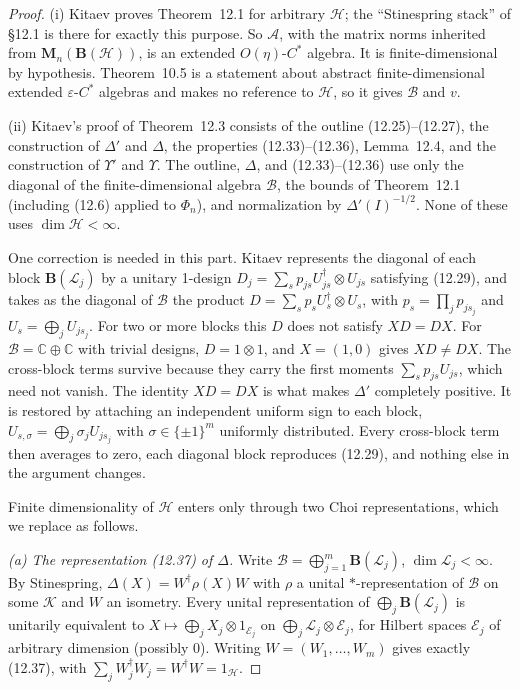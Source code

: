 \documentclass[11pt]{article}
\theoremstyle{remark}
\newcommand{\eps}{\varepsilon}
\newcommand{\cA}{\mathcal{A}}
\newcommand{\cB}{\mathcal{B}}
\newcommand{\cH}{\mathcal{H}}
\newcommand{\cK}{\mathcal{K}}
\newcommand{\cL}{\mathcal{L}}
\newcommand{\cE}{\mathcal{E}}
\newcommand{\Bo}{\mathbf{B}}
\newcommand{\Ma}[1]{\mathbf{M}_{#1}}
\begin{document}
\begin{proof}
(i) Kitaev proves Theorem~12.1 for arbitrary $\cH$; the ``Stinespring stack'' of \S12.1 is there for exactly this purpose. So $\cA$, with the matrix norms inherited from $\Ma{n}(\Bo(\cH))$, is an extended $O(\eta)$-$C^*$ algebra. It is finite-dimensional by hypothesis. Theorem~10.5 is a statement about abstract finite-dimensional extended $\eps$-$C^*$ algebras and makes no reference to $\cH$, so it gives $\cB$ and $v$.

(ii) Kitaev's proof of Theorem~12.3 consists of the outline (12.25)--(12.27), the construction of $\Delta'$ and $\Delta$, the properties (12.33)--(12.36), Lemma~12.4, and the construction of $\Upsilon'$ and $\Upsilon$. The outline, $\Delta$, and (12.33)--(12.36) use only the diagonal of the finite-dimensional algebra $\cB$, the bounds of Theorem~12.1 (including (12.6) applied to $\Phi_n$), and normalization by $\Delta'(I)^{-1/2}$. None of these uses $\dim\cH<\infty$.

One correction is needed in this part. Kitaev represents the diagonal of each block $\Bo(\cL_j)$ by a unitary 1-design $D_j=\sum_sp_{js}U_{js}^\dagger\otimes U_{js}$ satisfying (12.29), and takes as the diagonal of $\cB$ the product $D=\sum_sp_sU_s^\dagger\otimes U_s$, with $p_s=\prod_jp_{js_j}$ and $U_s=\bigoplus_jU_{js_j}$. For two or more blocks this $D$ does not satisfy $XD=DX$. For $\cB=\mathbb{C}\oplus\mathbb{C}$ with trivial designs, $D=1\otimes1$, and $X=(1,0)$ gives $XD\neq DX$. The cross-block terms survive because they carry the first moments $\sum_sp_{js}U_{js}$, which need not vanish. The identity $XD=DX$ is what makes $\Delta'$ completely positive. It is restored by attaching an independent uniform sign to each block, $U_{s,\sigma}=\bigoplus_j\sigma_jU_{js_j}$ with $\sigma\in\{\pm1\}^m$ uniformly distributed. Every cross-block term then averages to zero, each diagonal block reproduces (12.29), and nothing else in the argument changes.

Finite dimensionality of $\cH$ enters only through two Choi representations, which we replace as follows.

\emph{(a) The representation (12.37) of $\Delta$.} Write $\cB=\bigoplus_{j=1}^m\Bo(\cL_j)$, $\dim\cL_j<\infty$. By Stinespring, $\Delta(X)=W^\dagger\rho(X)W$ with $\rho$ a unital $*$-representation of $\cB$ on some $\cK$ and $W$ an isometry. Every unital representation of $\bigoplus_j\Bo(\cL_j)$ is unitarily equivalent to $X\mapsto\bigoplus_j X_j\otimes1_{\cE_j}$ on $\bigoplus_j\cL_j\otimes\cE_j$, for Hilbert spaces $\cE_j$ of arbitrary dimension (possibly $0$). Writing $W=(W_1,\dots,W_m)$ gives exactly (12.37), with $\sum_jW_j^\dagger W_j=W^\dagger W=1_\cH$.


\end{proof}
\end{document}
